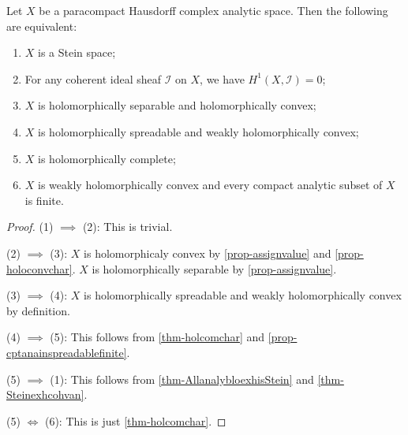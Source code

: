 \begin{thm}\label{thm-Steinchar}
    Let $X$ be a paracompact Hausdorff complex analytic space. Then the following are equivalent:
    \begin{enumerate}
        \item $X$ is a Stein space;
        \item For any coherent ideal sheaf $\mathcal{I}$ on $X$, we have $H^1(X,\mathcal{I})=0$;
        \item $X$ is holomorphically separable and holomorphically convex;
        \item $X$ is holomorphically spreadable and weakly holomorphically convex; %
        \item $X$ is holomorphically complete;
        \item $X$ is weakly holomorphically convex and every compact analytic subset of $X$ is finite.
    \end{enumerate}
\end{thm}
\begin{proof}
    (1) $\implies$ (2): This is trivial.

    (2) $\implies$ (3): $X$ is holomorphicaly convex by \cref{prop-assignvalue} and \cref{prop-holoconvchar}.
    $X$ is holomorphically separable by \cref{prop-assignvalue}.

    (3) $\implies$ (4): $X$ is holomorphically spreadable and weakly holomorphically convex by definition. %

    (4) $\implies$ (5): This follows from \cref{thm-holcomchar} and \cref{prop-cptanainspreadablefinite}.

    (5) $\implies$ (1): This follows from \cref{thm-AllanalybloexhisStein} and \cref{thm-Steinexhcohvan}.

    (5) $\Leftrightarrow$ (6): This is just \cref{thm-holcomchar}.
\end{proof}

